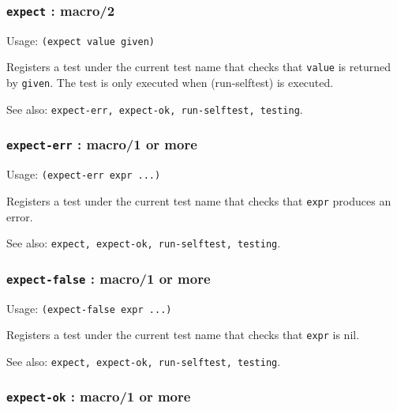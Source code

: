 \documentclass[
]{article}
\newcommand{\passthrough}[1]{#1}
\begin{document}
\hypertarget{expect-macro2}{%
\subsubsection{\texorpdfstring{\texttt{expect} :
macro/2}{expect : macro/2}}\label{expect-macro2}}

Usage: \passthrough{\lstinline!(expect value given)!}

Registers a test under the current test name that checks that
\passthrough{\lstinline!value!} is returned by
\passthrough{\lstinline!given!}. The test is only executed when
(run-selftest) is executed.

See also:
\passthrough{\lstinline!expect-err, expect-ok, run-selftest, testing!}.

\hypertarget{expect-err-macro1-or-more}{%
\subsubsection{\texorpdfstring{\texttt{expect-err} : macro/1 or
more}{expect-err : macro/1 or more}}\label{expect-err-macro1-or-more}}

Usage: \passthrough{\lstinline!(expect-err expr ...)!}

Registers a test under the current test name that checks that
\passthrough{\lstinline!expr!} produces an error.

See also:
\passthrough{\lstinline!expect, expect-ok, run-selftest, testing!}.

\hypertarget{expect-false-macro1-or-more}{%
\subsubsection{\texorpdfstring{\texttt{expect-false} : macro/1 or
more}{expect-false : macro/1 or more}}\label{expect-false-macro1-or-more}}

Usage: \passthrough{\lstinline!(expect-false expr ...)!}

Registers a test under the current test name that checks that
\passthrough{\lstinline!expr!} is nil.

See also:
\passthrough{\lstinline!expect, expect-ok, run-selftest, testing!}.

\hypertarget{expect-ok-macro1-or-more}{%
\subsubsection{\texorpdfstring{\texttt{expect-ok} : macro/1 or
more}{expect-ok : macro/1 or more}}\label{expect-ok-macro1-or-more}}
\end{document}
